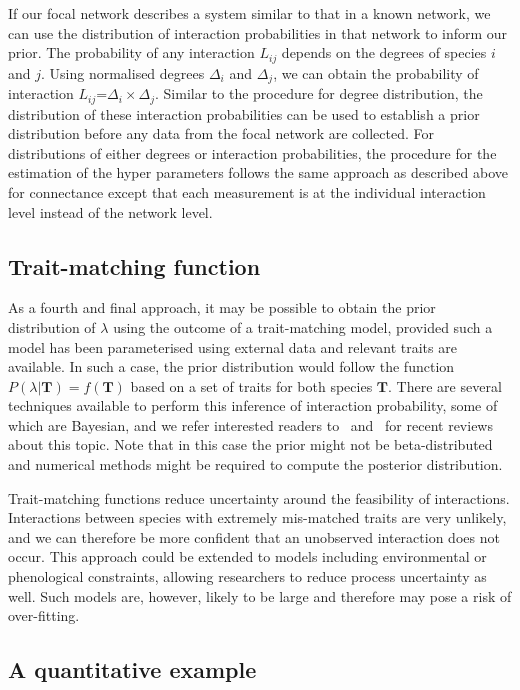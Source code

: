 \documentclass[12pt]{article}
\begin{document}
        If our focal network describes a system similar to that in a known network, we can use the distribution of interaction probabilities in that network to inform our prior. The probability of any interaction $L_{ij}$ depends on the degrees of species $i$ and $j$. Using normalised degrees $\Delta_i$ and $\Delta_j$, we can obtain the probability of interaction $L_{ij}$=$\Delta_i\times\Delta_j$. Similar to the procedure for degree distribution, the distribution of these interaction probabilities can be used to establish a prior distribution before any data from the focal network are collected. For distributions of either degrees or interaction probabilities, the procedure for the estimation of the hyper parameters follows the same approach as described above for connectance except that each measurement is at the individual interaction level instead of the network level.


    \subsection*{Trait-matching function} 

        As a fourth and final approach, it may be possible to obtain the prior distribution of $\lambda$ using the outcome of a trait-matching model, provided such a model has been parameterised using external data and relevant traits are available. In such a case, the prior distribution would follow the function $P(\lambda|\mathbf{T})=f(\mathbf{T})$ based on a set of traits for both species $\mathbf{T}$. There are several techniques available to perform this inference of interaction probability, some of which are Bayesian, and we refer interested readers to~\citet{Bartomeus2016} and~\citet{Weinstein2017} for recent reviews about this topic. Note that in this case the prior might not be beta-distributed and numerical methods might be required to compute the posterior distribution.  


        Trait-matching functions reduce uncertainty around the feasibility of interactions. Interactions between species with extremely mis-matched traits are very unlikely, and we can therefore be more confident that an unobserved interaction does not occur. This approach could be extended to models including environmental or phenological constraints, allowing researchers to reduce process uncertainty as well. Such models are, however, likely to be large and therefore may pose a risk of over-fitting.

    \subsection*{A quantitative example}
\end{document}
